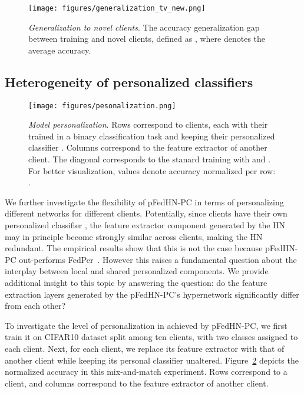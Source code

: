 \documentclass{article}
\newcommand\ourmethod{pFedHN}
\begin{document}
\begin{figure}[ht]
    \centering
    \texttt{[image: figures/generalization\_tv\_new.png]}
    \caption{\textit{Generalization to novel clients}. The accuracy generalization gap between training and novel clients, defined as , where  denotes the average accuracy.}
    \label{fig:gen}
\end{figure}

\subsection{Heterogeneity of personalized classifiers}

\begin{figure}[ht]
    \centering
    \texttt{[image: figures/pesonalization.png]}
    \caption{\textit{Model personalization}. Rows correspond to clients, each with their trained in a binary classification task and keeping their personalized classifier . Columns correspond to the feature extractor  of another client. The diagonal corresponds to the stanard training with  and . For better visualization, values denote accuracy normalized per row:  .}
    \label{fig:personalized_fe}
\end{figure}



We further investigate the flexibility of \ourmethod{}-PC in terms of personalizing different networks for different clients. 
Potentially, since clients have their own personalized classifier , the feature extractor component  generated by the HN may in principle become strongly similar across clients, making the HN redundant. The empirical results show that this is not the case because \ourmethod{}-PC out-performs FedPer~\cite{arivazhagan2019federated}. However this raises a fundamental question about the interplay between local and shared personalized components. We provide additional insight to this topic by answering the question: do the feature extraction layers generated by the \ourmethod{}-PC's hypernetwork significantly differ from each other?




To investigate the level of personalization in  achieved by \ourmethod{}-PC, we first train it on CIFAR10 dataset split among ten clients, with two classes assigned to each client. Next, for each client, we replace its feature extractor  with that of another client  while keeping its personal classifier  unaltered. 
Figure~\ref{fig:personalized_fe} depicts the normalized accuracy in this mix-and-match experiment. Rows correspond to a client, and columns correspond to the feature extractor of another client. 
\end{document}

